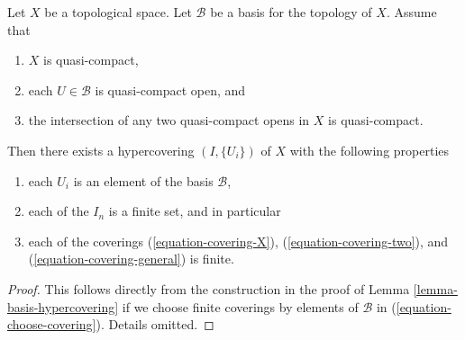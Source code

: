 \begin{lemma}
\label{lemma-quasi-separated-quasi-compact-hypercovering}
Let $X$ be a topological space.
Let $\mathcal{B}$ be a basis for the topology of $X$.
Assume that
\begin{enumerate}
\item $X$ is quasi-compact,
\item each $U \in \mathcal{B}$ is quasi-compact open, and
\item the intersection of any two quasi-compact opens in
$X$ is quasi-compact.
\end{enumerate}
Then there exists a hypercovering $(I, \{U_i\})$ of $X$ with the
following properties
\begin{enumerate}
\item each $U_i$ is an element of the basis $\mathcal{B}$,
\item each of the $I_n$ is a finite set, and in particular
\item each of the coverings  (\ref{equation-covering-X}),
(\ref{equation-covering-two}), and (\ref{equation-covering-general})
is finite.
\end{enumerate}
\end{lemma}

\begin{proof}
This follows directly from the construction in the proof of
Lemma \ref{lemma-basis-hypercovering} if we choose finite coverings
by elements of $\mathcal{B}$ in (\ref{equation-choose-covering}).
Details omitted.
\end{proof}









